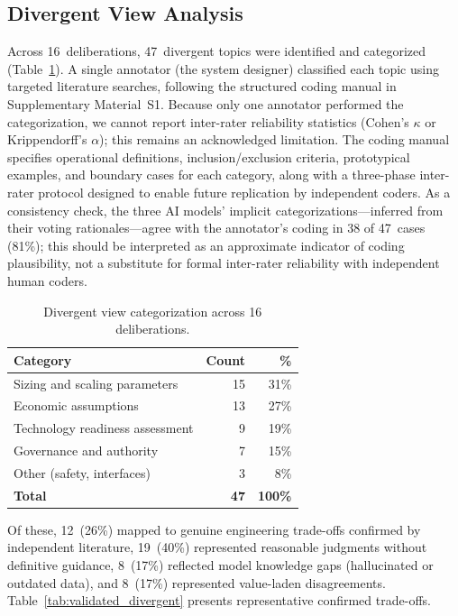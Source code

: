 \documentclass[11pt,a4paper]{article}
\begin{document}
\subsection{Divergent View Analysis}
\label{sec:divergent_analysis}

Across 16~deliberations, 47~divergent topics were identified and categorized (Table~\ref{tab:divergent}). A single annotator (the system designer) classified each topic using targeted literature searches, following the structured coding manual in Supplementary Material~S1. Because only one annotator performed the categorization, we cannot report inter-rater reliability statistics (Cohen's $\kappa$ or Krippendorff's $\alpha$); this remains an acknowledged limitation. The coding manual specifies operational definitions, inclusion/exclusion criteria, prototypical examples, and boundary cases for each category, along with a three-phase inter-rater protocol designed to enable future replication by independent coders. As a consistency check, the three AI models' implicit categorizations---inferred from their voting rationales---agree with the annotator's coding in 38 of 47~cases (81\%); this should be interpreted as an approximate indicator of coding plausibility, not a substitute for formal inter-rater reliability with independent human coders.

\begin{table}[ht]
\centering
\caption{Divergent view categorization across 16 deliberations.}
\label{tab:divergent}
\begin{tabular}{@{}lrr@{}}
\toprule
\textbf{Category} & \textbf{Count} & \textbf{\%} \\
\midrule
Sizing and scaling parameters & 15 & 31\% \\
Economic assumptions & 13 & 27\% \\
Technology readiness assessment & 9 & 19\% \\
Governance and authority & 7 & 15\% \\
Other (safety, interfaces) & 3 & 8\% \\
\midrule
\textbf{Total} & \textbf{47} & \textbf{100\%} \\
\bottomrule
\end{tabular}
\end{table}

Of these, 12~(26\%) mapped to genuine engineering trade-offs confirmed by independent literature, 19~(40\%) represented reasonable judgments without definitive guidance, 8~(17\%) reflected model knowledge gaps (hallucinated or outdated data), and 8~(17\%) represented value-laden disagreements. Table~\ref{tab:validated_divergent} presents representative confirmed trade-offs.
\end{document}
